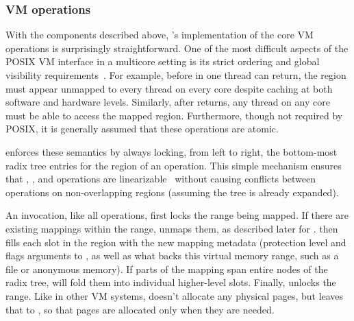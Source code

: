 \subsubsection{VM operations}
\label{sec:radixvm:ops}

With the components described above, \vm's implementation of the core
VM operations is surprisingly straightforward.
%
One of the most difficult aspects of the POSIX VM interface in a
multicore setting is its strict ordering and global visibility
requirements~\cite{clements:bonsai}.
%
For example, before  in one thread can return, the region
must appear unmapped to every thread on every core despite caching at
both software and hardware levels.
%
Similarly, after  returns, any thread on any core
must be able to access the mapped region.  Furthermore, though not
required by POSIX, it is generally assumed that these operations are
atomic.

\vm enforces these semantics by always locking, from left to right,
the bottom-most radix tree entries for the region of an operation.
%
This simple mechanism ensures that , , and
 operations are
linearizable~\cite{herlihy:linearizability} without causing conflicts
between operations on non-overlapping regions (assuming the tree is
already expanded).


An  invocation, like all \vm operations, first locks the
range being mapped.
%
If there are existing mappings within the
range,  unmaps them, as described later for .
 then fills each slot in the region with the new mapping
metadata (protection
level and flags arguments to , as well as what backs this virtual
memory range, such as a file or anonymous memory).
%
If parts of the mapping span entire nodes of the radix tree, \vm will
fold them into individual higher-level slots.
%
Finally, \vm unlocks the range.  Like in other VM systems,
doesn't allocate any physical pages, but leaves that to ,
so that pages are allocated only when they are needed.

